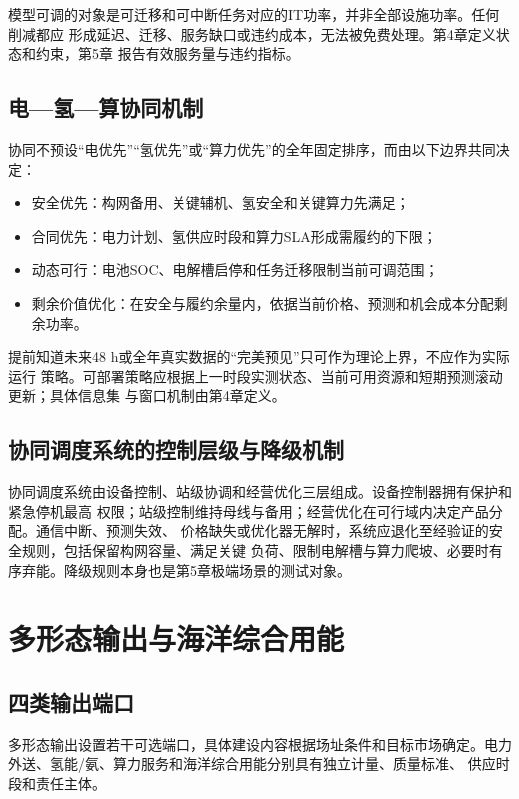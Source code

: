 模型可调的对象是可迁移和可中断任务对应的IT功率，并非全部设施功率。任何削减都应
形成延迟、迁移、服务缺口或违约成本，无法被免费处理。第4章定义状态和约束，第5章
报告有效服务量与违约指标。

\subsection{电—氢—算协同机制}

协同不预设“电优先”“氢优先”或“算力优先”的全年固定排序，而由以下边界共同决定：
\begin{itemize}
  \item 安全优先：构网备用、关键辅机、氢安全和关键算力先满足；
  \item 合同优先：电力计划、氢供应时段和算力SLA形成需履约的下限；
  \item 动态可行：电池SOC、电解槽启停和任务迁移限制当前可调范围；
  \item 剩余价值优化：在安全与履约余量内，依据当前价格、预测和机会成本分配剩余功率。
\end{itemize}

提前知道未来48 h或全年真实数据的“完美预见”只可作为理论上界，不应作为实际运行
策略。可部署策略应根据上一时段实测状态、当前可用资源和短期预测滚动更新；具体信息集
与窗口机制由第4章定义。

\subsection{协同调度系统的控制层级与降级机制}

协同调度系统由设备控制、站级协调和经营优化三层组成。设备控制器拥有保护和紧急停机最高
权限；站级控制维持母线与备用；经营优化在可行域内决定产品分配。通信中断、预测失效、
价格缺失或优化器无解时，系统应退化至经验证的安全规则，包括保留构网容量、满足关键
负荷、限制电解槽与算力爬坡、必要时有序弃能。降级规则本身也是第5章极端场景的测试对象。

\section{多形态输出与海洋综合用能}

\subsection{四类输出端口}

多形态输出设置若干可选端口，具体建设内容根据场址条件和目标市场确定。电力外送、氢能/氨、算力服务和海洋综合用能分别具有独立计量、质量标准、
供应时段和责任主体。

